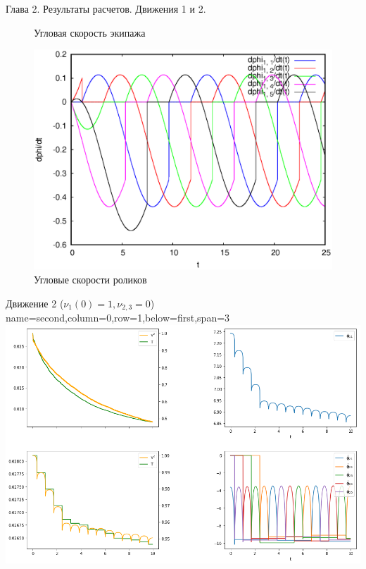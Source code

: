 \begin{myposter}{
    Глава 2. Результаты расчетов. Движения 1 и 2.
}
{{\begin{figure}[H]
                    \vspace{-15pt}
                    \caption{Угловая скорость экипажа}
                \endminipage
                    \centering
                    \includegraphics[width=\linewidth]{content/pic/self_rot_25/rol_vel.eps}
                    \vspace{-15pt}
                    \caption{Угловые скорости роликов}
                \endminipage
            \end{figure}
            \vspace{10pt}
        }
    }
    
    \headerbox
    {Движение 2 ($\nu_1(0) = 1, \nu_{2,3} = 0$)}
    {name=second,column=0,row=1,below=first,span=3}
    {
        {\huge\bf
            \vspace{10pt}
            \centering
            \includegraphics[width=\linewidth]{content/pic/new/impact_2.png}
            \vspace{10pt}
        }
    }
    
\end{myposter}
